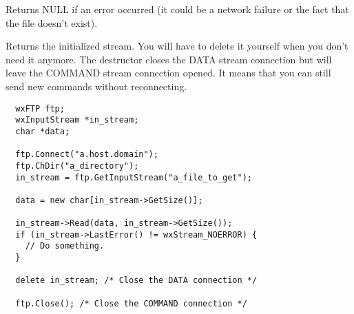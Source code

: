 
Returns NULL if an error occurred (it could be a network failure or the fact
that the file doesn't exist).

Returns the initialized stream. You will have to delete it yourself when you
don't need it anymore. The destructor closes the DATA stream connection but
will leave the COMMAND stream connection opened. It means that you can still
send new commands without reconnecting.


\begin{verbatim}
  wxFTP ftp;
  wxInputStream *in_stream;
  char *data;

  ftp.Connect("a.host.domain");
  ftp.ChDir("a_directory");
  in_stream = ftp.GetInputStream("a_file_to_get");

  data = new char[in_stream->GetSize()];

  in_stream->Read(data, in_stream->GetSize());
  if (in_stream->LastError() != wxStream_NOERROR) {
    // Do something.
  }

  delete in_stream; /* Close the DATA connection */

  ftp.Close(); /* Close the COMMAND connection */
\end{verbatim}



